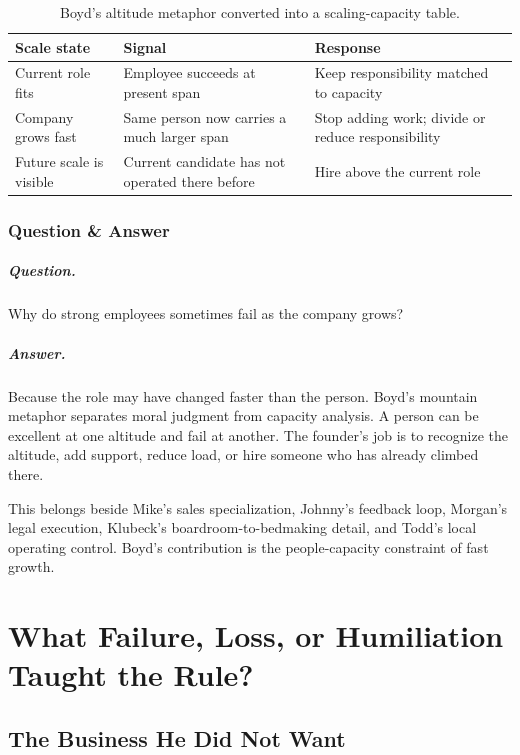 \documentclass[11pt,oneside]{book}
\begin{document}
\begin{table}
\centering
\small
\begin{tabular}{|p{.24\linewidth}|p{.28\linewidth}|p{.36\linewidth}|}
\hline
\textbf{Scale state} & \textbf{Signal} & \textbf{Response} \\
\hline
Current role fits & Employee succeeds at present span & Keep responsibility matched to capacity \\
\hline
Company grows fast & Same person now carries a much larger span & Stop adding work; divide or reduce responsibility \\
\hline
Future scale is visible & Current candidate has not operated there before & Hire above the current role \\
\hline
\end{tabular}
\caption{Boyd's altitude metaphor converted into a scaling-capacity table.}
\end{table}

\subsection{Question \& Answer}

\paragraph{Question.}
Why do strong employees sometimes fail as the company grows?

\paragraph{Answer.}
Because the role may have changed faster than the person. Boyd's mountain metaphor separates moral judgment from capacity analysis. A person can be excellent at one altitude and fail at another. The founder's job is to recognize the altitude, add support, reduce load, or hire someone who has already climbed there.

This belongs beside Mike's sales specialization, Johnny's feedback loop, Morgan's legal execution, Klubeck's boardroom-to-bedmaking detail, and Todd's local operating control. Boyd's contribution is the people-capacity constraint of fast growth.

\chapter{What Failure, Loss, or Humiliation Taught the Rule?}

\section{The Business He Did Not Want}
\end{document}
